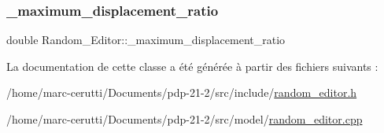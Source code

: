 \subsubsection{\texorpdfstring{\+\_\+maximum\+\_\+displacement\+\_\+ratio}{\_maximum\_displacement\_ratio}}
{\footnotesize\ttfamily double Random\+\_\+\+Editor\+::\+\_\+maximum\+\_\+displacement\+\_\+ratio\hspace{0.3cm}{\ttfamily [private]}}



La documentation de cette classe a été générée à partir des fichiers suivants \+:\begin{DoxyCompactItemize}
\item 
/home/marc-\/cerutti/\+Documents/pdp-\/21-\/2/src/include/\hyperlink{random__editor_8h}{random\+\_\+editor.\+h}\item 
/home/marc-\/cerutti/\+Documents/pdp-\/21-\/2/src/model/\hyperlink{random__editor_8cpp}{random\+\_\+editor.\+cpp}\end{DoxyCompactItemize}
